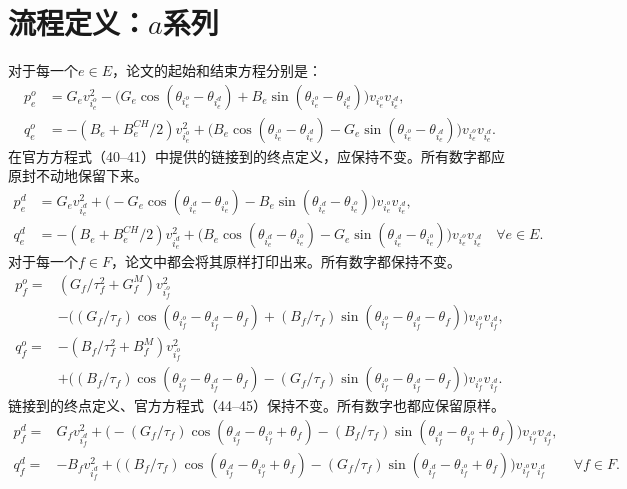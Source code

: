 \documentclass{article}
\begin{document}
\section*{流程定义：$a$系列}
对于每一个$e\in E$，论文的起始和结束方程分别是：
\begin{equation}\tag{2.1}
\begin{aligned}
p_e^o&=G_ev_{i_e^o}^2-\bigl(G_e\cos(\theta_{i_e^o}-\theta_{i_e^d})+B_e\sin(\theta_{i_e^o}-\theta_{i_e^d})\bigr)v_{i_e^o}v_{i_e^d},\\
q_e^o&=-(B_e+B_e^{CH}/2)v_{i_e^o}^2
+\bigl(B_e\cos(\theta_{i_e^o}-\theta_{i_e^d})-G_e\sin(\theta_{i_e^o}-\theta_{i_e^d})\bigr)v_{i_e^o}v_{i_e^d}.
\end{aligned}
\end{equation}
在官方方程式（40–41）中提供的链接到的终点定义，应保持不变。所有数字都应原封不动地保留下来。
\begin{align*}
p_e^d&=G_ev_{i_e^d}^2+\bigl(-G_e\cos(\theta_{i_e^d}-\theta_{i_e^o})-B_e\sin(\theta_{i_e^d}-\theta_{i_e^o})\bigr)v_{i_e^o}v_{i_e^d},\\
q_e^d&=-(B_e+B_e^{CH}/2)v_{i_e^d}^2+\bigl(B_e\cos(\theta_{i_e^d}-\theta_{i_e^o})-G_e\sin(\theta_{i_e^d}-\theta_{i_e^o})\bigr)v_{i_e^o}v_{i_e^d}
\quad\forall e\in E.
\end{align*}
对于每一个$f\in F$，论文中都会将其原样打印出来。所有数字都保持不变。
\begin{equation}\tag{2.2}
\begin{aligned}
p_f^o={}&(G_f/\tau_f^2+G_f^M)v_{i_f^o}^2\\
&-\bigl((G_f/\tau_f)\cos(\theta_{i_f^o}-\theta_{i_f^d}-\theta_f)
 +(B_f/\tau_f)\sin(\theta_{i_f^o}-\theta_{i_f^d}-\theta_f)\bigr)v_{i_f^o}v_{i_f^d},\\
q_f^o={}&-(B_f/\tau_f^2+B_f^M)v_{i_f^o}^2\\
&+\bigl((B_f/\tau_f)\cos(\theta_{i_f^o}-\theta_{i_f^d}-\theta_f)
 -(G_f/\tau_f)\sin(\theta_{i_f^o}-\theta_{i_f^d}-\theta_f)\bigr)v_{i_f^o}v_{i_f^d}.
\end{aligned}
\end{equation}
链接到的终点定义、官方方程式（44–45）保持不变。所有数字也都应保留原样。
\begin{align*}
p_f^d={}&G_fv_{i_f^d}^2+
\bigl(-(G_f/\tau_f)\cos(\theta_{i_f^d}-\theta_{i_f^o}+\theta_f)
 -(B_f/\tau_f)\sin(\theta_{i_f^d}-\theta_{i_f^o}+\theta_f)\bigr)v_{i_f^o}v_{i_f^d},\\
q_f^d={}&-B_fv_{i_f^d}^2+
\bigl((B_f/\tau_f)\cos(\theta_{i_f^d}-\theta_{i_f^o}+\theta_f)
 -(G_f/\tau_f)\sin(\theta_{i_f^d}-\theta_{i_f^o}+\theta_f)\bigr)v_{i_f^o}v_{i_f^d}
\qquad\forall f\in F.
\end{align*}
\end{document}
